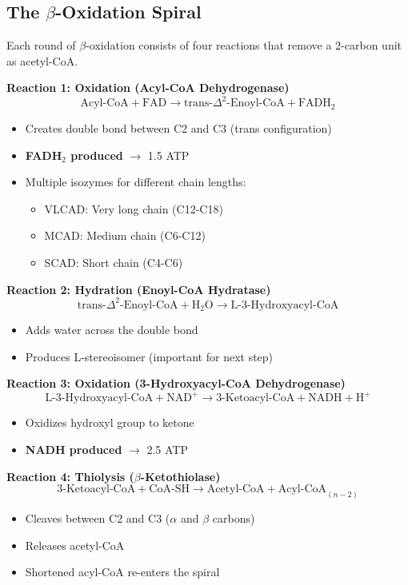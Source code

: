 \subsection{The $\beta$-Oxidation Spiral}

Each round of $\beta$-oxidation consists of four reactions that remove a 2-carbon unit as acetyl-CoA.

\textbf{Reaction 1: Oxidation (Acyl-CoA Dehydrogenase)}
\[
\text{Acyl-CoA} + \text{FAD} \rightarrow \text{trans-}\Delta^2\text{-Enoyl-CoA} + \text{FADH}_2
\]
\begin{itemize}
    \item Creates double bond between C2 and C3 (trans configuration)
    \item \textbf{FADH$_2$ produced} $\rightarrow$ 1.5 ATP
    \item Multiple isozymes for different chain lengths:
    \begin{itemize}
        \item VLCAD: Very long chain (C12-C18)
        \item MCAD: Medium chain (C6-C12)
        \item SCAD: Short chain (C4-C6)
    \end{itemize}
\end{itemize}

\textbf{Reaction 2: Hydration (Enoyl-CoA Hydratase)}
\[
\text{trans-}\Delta^2\text{-Enoyl-CoA} + \text{H}_2\text{O} \rightarrow \text{L-3-Hydroxyacyl-CoA}
\]
\begin{itemize}
    \item Adds water across the double bond
    \item Produces L-stereoisomer (important for next step)
\end{itemize}

\textbf{Reaction 3: Oxidation (3-Hydroxyacyl-CoA Dehydrogenase)}
\[
\text{L-3-Hydroxyacyl-CoA} + \text{NAD}^+ \rightarrow \text{3-Ketoacyl-CoA} + \text{NADH} + \text{H}^+
\]
\begin{itemize}
    \item Oxidizes hydroxyl group to ketone
    \item \textbf{NADH produced} $\rightarrow$ 2.5 ATP
\end{itemize}

\textbf{Reaction 4: Thiolysis ($\beta$-Ketothiolase)}
\[
\text{3-Ketoacyl-CoA} + \text{CoA-SH} \rightarrow \text{Acetyl-CoA} + \text{Acyl-CoA}_{(n-2)}
\]
\begin{itemize}
    \item Cleaves between C2 and C3 ($\alpha$ and $\beta$ carbons)
    \item Releases acetyl-CoA
    \item Shortened acyl-CoA re-enters the spiral
\end{itemize}

